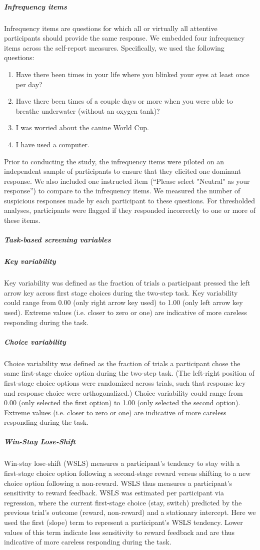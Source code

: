 \documentclass[a4paper,notitlepage,12pt]{article}
\begin{document}
\begin{refsection}[supp]
\subparagraph{Infrequency items} 

Infrequency items are questions for which all or virtually all attentive participants should provide the same response. We embedded four infrequency items across the self-report measures. Specifically, we used the following questions:

\begin{enumerate}
  \item Have there been times in your life where you blinked your eyes at least once per day?
  \item Have there been times of a couple days or more when you were able to breathe underwater (without an oxygen tank)?
  \item I was worried about the canine World Cup.
  \item I have used a computer.
\end{enumerate}

Prior to conducting the study, the infrequency items were piloted on an independent sample of participants to ensure that they elicited one dominant response. We also included one instructed item (``Please select "Neutral" as your response'') to compare to the infrequency items. We measured the number of suspicious responses made by each participant to these questions. For thresholded analyses, participants were flagged if they responded incorrectly to one or more of these items. 

\subparagraph{Task-based screening variables}

\subparagraph{Key variability} Key variability was defined as the fraction of trials a participant pressed the left arrow key across first stage choices during the two-step task. Key variability could range from 0.00 (only right arrow key used) to 1.00 (only left arrow key used). Extreme values (i.e. closer to zero or one) are indicative of more careless responding during the task.  

\subparagraph{Choice variability} Choice variability was defined as the fraction of trials a participant chose the same first-stage choice option during the two-step task. (The left-right position of first-stage choice options were randomized across trials, such that response key and response choice were orthogonalized.) Choice variability could range from 0.00 (only selected the first option) to 1.00 (only selected the second option). Extreme values (i.e. closer to zero or one) are indicative of more careless responding during the task.  

\subparagraph{Win-Stay Lose-Shift} Win-stay lose-shift (WSLS) measures a participant's tendency to stay with a first-stage choice option following a second-stage reward versus shifting to a new choice option following a non-reward. WSLS thus measures a participant's sensitivity to reward feedback. WSLS was estimated per participant via regression, where the current first-stage choice (stay, switch) predicted by the previous trial's outcome (reward, non-reward) and a stationary intercept. Here we used the first (slope) term to represent a participant's WSLS tendency. Lower values of this term indicate less sensitivity to reward feedback and are thus indicative of more careless responding during the task.


\end{refsection}
\end{document}
